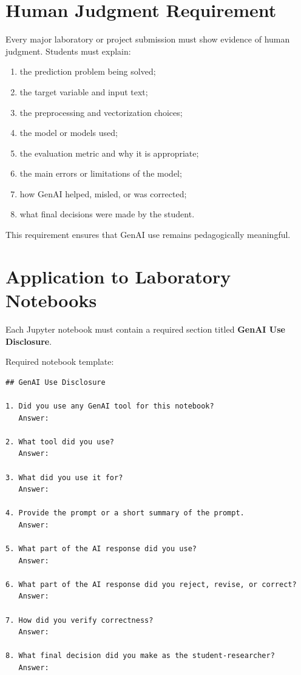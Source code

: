 \documentclass[11pt]{article}
\begin{document}
\section{Human Judgment Requirement}

Every major laboratory or project submission must show evidence of human judgment. Students must explain:

\begin{enumerate}
    \item the prediction problem being solved;
    \item the target variable and input text;
    \item the preprocessing and vectorization choices;
    \item the model or models used;
    \item the evaluation metric and why it is appropriate;
    \item the main errors or limitations of the model;
    \item how GenAI helped, misled, or was corrected;
    \item what final decisions were made by the student.
\end{enumerate}

This requirement ensures that GenAI use remains pedagogically meaningful.

\section{Application to Laboratory Notebooks}

Each Jupyter notebook must contain a required section titled \textbf{GenAI Use Disclosure}.

Required notebook template:

\begin{verbatim}
## GenAI Use Disclosure

1. Did you use any GenAI tool for this notebook?
   Answer:

2. What tool did you use?
   Answer:

3. What did you use it for?
   Answer:

4. Provide the prompt or a short summary of the prompt.
   Answer:

5. What part of the AI response did you use?
   Answer:

6. What part of the AI response did you reject, revise, or correct?
   Answer:

7. How did you verify correctness?
   Answer:

8. What final decision did you make as the student-researcher?
   Answer:
\end{verbatim}
\end{document}
